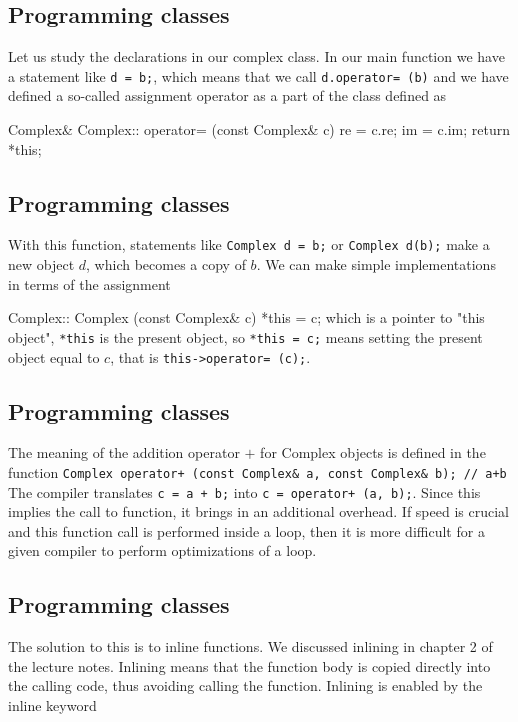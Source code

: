 \documentclass[%
oneside,                 %
final,                   %
10pt]{article}
\begin{document}
{{{{{{{{{{{{{{%
\subsection{Programming classes}

Let us study the declarations in our complex class.
In our main function we have a statement like \Verb!d = b;!, which means
that we call \Verb!d.operator= (b)! and we have defined a so-called assignment operator
as a part of the class defined as

\bcppcod
Complex& Complex:: operator= (const Complex& c)
{
   re = c.re;
   im = c.im;
   return *this;
}
\ecppcod

\subsection{Programming classes}

With this function, statements like
\Verb!Complex d = b;! or \Verb!Complex d(b);!
make a new object $d$, which becomes a copy of $b$.
We can make simple implementations in terms of the assignment

\bcppcod
Complex:: Complex (const Complex& c)
{ *this = c; }
\ecppcod
which  is a pointer to "this object", \Verb!*this! is the present object,
so \Verb!*this = c;! means setting the present object equal to $c$, that is
\Verb!this->operator= (c);!.

\subsection{Programming classes}

The meaning of the addition operator $+$ for Complex objects is defined in the
function
\Verb!Complex operator+ (const Complex& a, const Complex& b); // a+b!
The compiler translates \Verb!c = a + b;! into \Verb!c = operator+ (a, b);!.
Since this implies the call to function, it brings in an additional overhead. If speed
is crucial and this function call is performed inside a loop, then it is more difficult for a
given compiler to perform optimizations of a loop.

\subsection{Programming classes}

The solution to this is to inline functions.   We discussed inlining in chapter
2 of the lecture notes.
Inlining means that the function body is copied directly into
the calling code, thus avoiding calling the function.
Inlining is enabled by the inline keyword

}}}}}}}}}}}}}}
\end{document}
